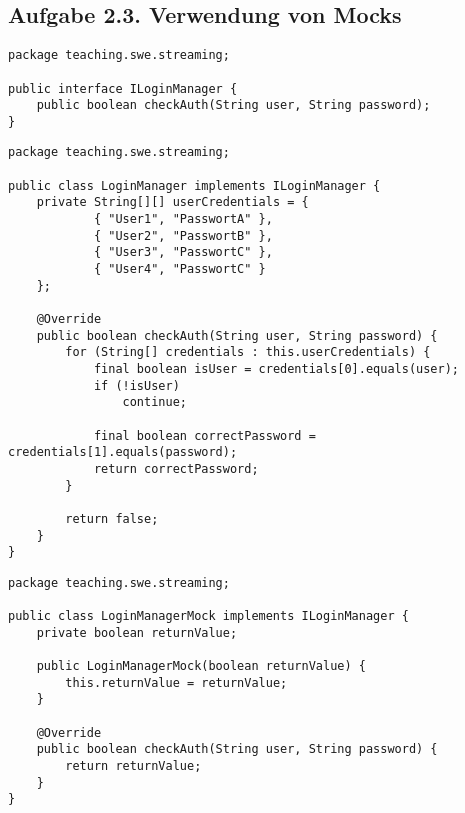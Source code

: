 \subsection*{Aufgabe 2.3. Verwendung von Mocks}

\begin{lstlisting}[style=javastyle, caption=ILoginManager]
package teaching.swe.streaming;

public interface ILoginManager {
    public boolean checkAuth(String user, String password);
}

\end{lstlisting}
\begin{lstlisting}[style=javastyle, caption=LoginManager implements ILoginManager]
package teaching.swe.streaming;

public class LoginManager implements ILoginManager {
    private String[][] userCredentials = {
            { "User1", "PasswortA" },
            { "User2", "PasswortB" },
            { "User3", "PasswortC" },
            { "User4", "PasswortC" }
    };

    @Override
    public boolean checkAuth(String user, String password) {
        for (String[] credentials : this.userCredentials) {
            final boolean isUser = credentials[0].equals(user);
            if (!isUser)
                continue;

            final boolean correctPassword = credentials[1].equals(password);
            return correctPassword;
        }

        return false;
    }
}
\end{lstlisting}
\begin{lstlisting}[style=javastyle, caption=LoginManagerMock]
package teaching.swe.streaming;

public class LoginManagerMock implements ILoginManager {
    private boolean returnValue;

    public LoginManagerMock(boolean returnValue) {
        this.returnValue = returnValue;
    }

    @Override
    public boolean checkAuth(String user, String password) {
        return returnValue;
    }
}

\end{lstlisting}
